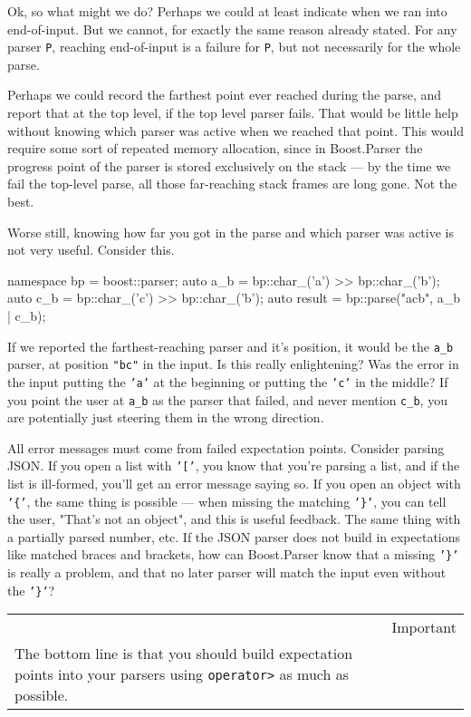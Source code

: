 Ok, so what might we do? Perhaps we could at least indicate when we ran into end-of-input. But we cannot, for exactly the same reason already stated. For any parser \texttt{P}, reaching end-of-input is a failure for \texttt{P}, but not necessarily for the whole parse.

Perhaps we could record the farthest point ever reached during the parse, and report that at the top level, if the top level parser fails. That would be little help without knowing which parser was active when we reached that point. This would require some sort of repeated memory allocation, since in Boost.Parser the progress point of the parser is stored exclusively on the stack --- by the time we fail the top-level parse, all those far-reaching stack frames are long gone. Not the best.

Worse still, knowing how far you got in the parse and which parser was active is not very useful. Consider this.

\begin{code}
namespace bp = boost::parser;
auto a_b = bp::char_('a') >> bp::char_('b');
auto c_b = bp::char_('c') >> bp::char_('b');
auto result = bp::parse("acb", a_b | c_b);
\end{code}

If we reported the farthest-reaching parser and it's position, it would be the \texttt{a\_b} parser, at position \texttt{"bc"} in the input. Is this really enlightening? Was the error in the input putting the \texttt{'a'} at the beginning or putting the \texttt{'c'} in the middle? If you point the user at \texttt{a\_b} as the parser that failed, and never mention \texttt{c\_b}, you are potentially just steering them in the wrong direction.

All error messages must come from failed expectation points. Consider parsing JSON. If you open a list with \texttt{'{[}'}, you know that you're parsing a list, and if the list is ill-formed, you'll get an error message saying so. If you open an object with \texttt{'\{'}, the same thing is possible --- when missing the matching \texttt{'\}'}, you can tell the user, "That's not an object", and this is useful feedback. The same thing with a partially parsed number, etc. If the JSON parser does not build in expectations like matched braces and brackets, how can Boost.Parser know that a missing \texttt{'\}'} is really a problem, and that no later parser will match the input even without the \texttt{'\}'}?

\begin{longtable}[]{@{}
  >{\raggedright\arraybackslash}p{}
  >{\raggedright\arraybackslash}p{}@{}}
\toprule\noalign{}
\endhead
\bottomrule\noalign{}
\endlastfoot
\begin{minipage}[t]{\linewidth}\raggedright
\end{minipage} & Important \\
The bottom line is that you should build expectation points into your parsers using \texttt{operator>} as much as possible. & \\
\end{longtable}

